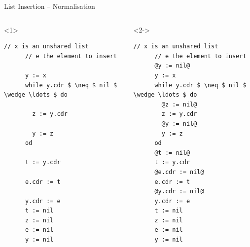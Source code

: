 \documentclass[xcolor={usenames,dvipsnames}]{beamer}
\begin{document}
\begin{frame}[fragile]{List Insertion -- Normalisation}
  \begin{columns}[T]
	  \vspace{-1em}
	  \begin{onlyenv}
	  \begin{lstlisting}[mathescape]
	  // x is an unshared list
	  // e the element to insert
	  
	  y := x
	  while y.cdr $ \neq $ nil $ \wedge \ldots $ do

	    z := y.cdr

	    y := z
	  od

	  t := y.cdr

	  e.cdr := t

	  y.cdr := e
	  t := nil
	  z := nil
	  e := nil
	  y := nil
	  \end{lstlisting}
	  \end{onlyenv}
	  \begin{onlyenv}<2->
	  \begin{lstlisting}[mathescape]
	  // x is an unshared list
	  // e the element to insert
	  @y := nil@
	  y := x
	  while y.cdr $ \neq $ nil $ \wedge \ldots $ do
	    @z := nil@
	    z := y.cdr
	    @y := nil@
	    y := z
	  od
	  @t := nil@
	  t := y.cdr
	  @e.cdr := nil@
	  e.cdr := t
	  @y.cdr := nil@
	  y.cdr := e
	  t := nil
	  z := nil
	  e := nil
	  y := nil
	  \end{lstlisting}
    \end{onlyenv}
        \pause\pause
        \begin{tikzpicture}[ampersand replacement=\&, >=latex,
          level 2/.style={onslide=<-3>{transparent}}]
        

\end{tikzpicture}
\end{columns}
\end{frame}
\end{document}
